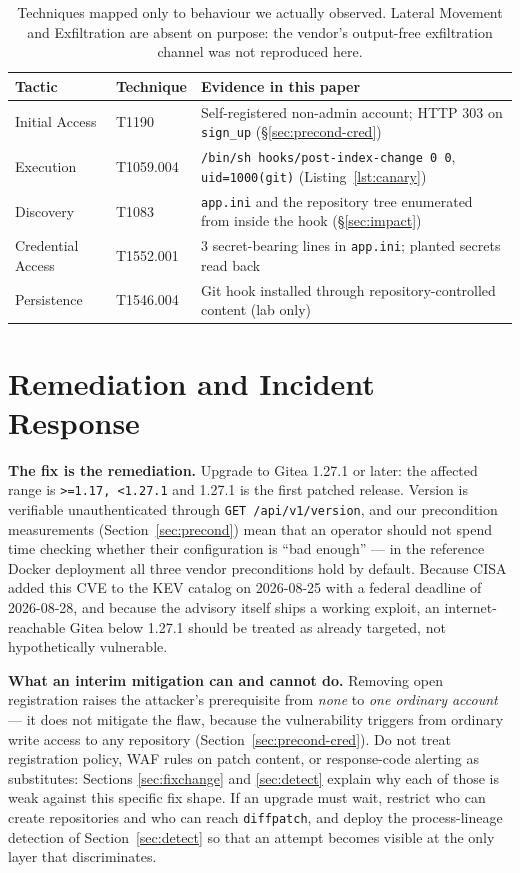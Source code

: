 \documentclass[journal]{IEEEtran}
\begin{document}
\begin{table}[t]
\centering
\footnotesize
\begin{tabular}{@{}p{1.3cm}p{2.0cm}p{4.2cm}@{}}
\toprule
Tactic & Technique & Evidence in this paper \\
\midrule
Initial Access & T1190 & Self-registered non-admin account; HTTP 303 on
\texttt{sign\_up} (\S\ref{sec:precond-cred}) \\
Execution & T1059.004 & \texttt{/bin/sh hooks/}\allowbreak\texttt{post-index-change
0 0}, \texttt{uid=1000(git)} (Listing~\ref{lst:canary}) \\
Discovery & T1083 & \texttt{app.ini} and the repository tree enumerated from
inside the hook (\S\ref{sec:impact}) \\
Credential Access & T1552.001 & 3 secret-bearing lines in \texttt{app.ini};
planted secrets read back \\
Persistence & T1546.004 & Git hook installed through repository-controlled
content (lab only) \\
\bottomrule
\end{tabular}
\caption{Techniques mapped only to behaviour we actually observed. Lateral
Movement and Exfiltration are absent on purpose: the vendor's output-free
exfiltration channel was not reproduced here.}
\label{tab:attack}
\end{table}
\section{Remediation and Incident Response}
\label{sec:remediation}

\textbf{The fix is the remediation.} Upgrade to Gitea 1.27.1 or later: the
affected range is \texttt{>=1.17, <1.27.1} and 1.27.1 is the first patched
release. Version is verifiable unauthenticated through
\texttt{GET /api/v1/version}, and our precondition measurements
(Section~\ref{sec:precond}) mean that an operator should not spend time
checking whether their configuration is ``bad enough'' --- in the reference
Docker deployment all three vendor preconditions hold by default. Because
CISA added this CVE to the KEV catalog on 2026-08-25 with a federal deadline
of 2026-08-28, and because the advisory itself ships a working exploit, an
internet-reachable Gitea below 1.27.1 should be treated as already targeted,
not hypothetically vulnerable.

\textbf{What an interim mitigation can and cannot do.} Removing open
registration raises the attacker's prerequisite from \emph{none} to
\emph{one ordinary account} --- it does not mitigate the flaw, because the
vulnerability triggers from ordinary write access to any repository
(Section~\ref{sec:precond-cred}). Do not treat registration policy, WAF rules
on patch content, or response-code alerting as substitutes: Sections
\ref{sec:fixchange} and \ref{sec:detect} explain why each of those is weak
against this specific fix shape. If an upgrade must wait, restrict who can
create repositories and who can reach \texttt{diffpatch}, and deploy the
process-lineage detection of Section~\ref{sec:detect} so that an attempt
becomes visible at the only layer that discriminates.
\end{document}
